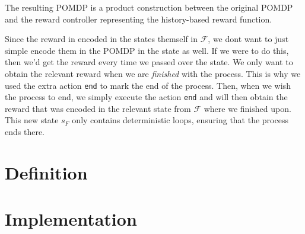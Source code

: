 


The resulting POMDP is a product construction between the original POMDP and the reward controller representing the history-based reward function. 

Since the reward in encoded in the states themself in $\mathcal{F}$, we dont want to just simple encode them in the POMDP in the state as well. If we were to do this, then we'd get the reward every time we passed over the state. We only want to obtain the relevant reward when we are \textit{finished} with the process. This is why we used the extra action \texttt{end} to mark the end of the process. Then, when we wish the process to end, we simply execute the action \texttt{end} and will then obtain the reward that was encoded in the relevant state from $\mathcal{F}$ where we finished upon. This new state $s_F$ only contains deterministic loops, ensuring that the process ends there. 

\section{Definition}


\section{Implementation}


